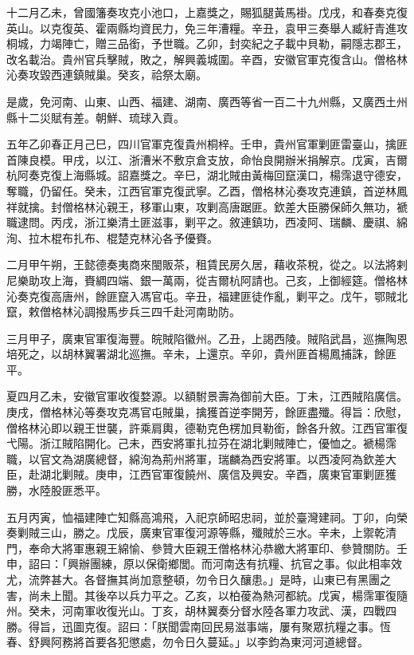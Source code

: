 \begin{pinyinscope}
十二月乙未，曾國籓奏攻克小池口，上嘉獎之，賜狐腿黃馬褂。戊戌，和春奏克復英山。以克復英、霍兩縣均資民力，免三年漕糧。辛丑，袁甲三奏舉人臧紆青進攻桐城，力竭陣亡，贈三品銜，予世職。乙卯，封奕紀之子載中貝勒，嗣隱志郡王，改名載治。貴州官兵擊賊，敗之，解興義城圍。辛酉，安徽官軍克復含山。僧格林沁奏攻毀西連鎮賊巢。癸亥，祫祭太廟。

是歲，免河南、山東、山西、福建、湖南、廣西等省一百二十九州縣，又廣西土州縣十二災賦有差。朝鮮、琉球入貢。

五年乙卯春正月己巳，四川官軍克復貴州桐梓。壬申，貴州官軍剿匪雷臺山，擒匪首陳良模。甲戌，以江、浙漕米不敷京倉支放，命怡良開辦米捐解京。戊寅，吉爾杭阿奏克復上海縣城。詔嘉獎之。辛巳，湖北賊由黃梅回竄漢口，楊霈退守德安，奪職，仍留任。癸未，江西官軍克復武寧。乙酉，僧格林沁奏攻克連鎮，首逆林鳳祥就擒。封僧格林沁親王，移軍山東，攻剿高唐踞匪。欽差大臣勝保師久無功，褫職逮問。丙戌，浙江樂清土匪滋事，剿平之。敘連鎮功，西凌阿、瑞麟、慶祺、綿洵、拉木棍布扎布、棍楚克林沁各予優賚。

二月甲午朔，王懿德奏夷商來閩販茶，租賃民房久居，藉收茶稅，從之。以法將剌尼樂助攻上海，賚綢四端、銀一萬兩，從吉爾杭阿請也。己亥，上御經筵。僧格林沁奏克復高唐州，餘匪竄入馮官屯。辛丑，福建匪徒作亂，剿平之。戊午，鄂賊北竄，敕僧格林沁調撥馬步兵三四千赴河南助防。

三月甲子，廣東官軍復海豐。皖賊陷徽州。乙丑，上謁西陵。賊陷武昌，巡撫陶恩培死之，以胡林翼署湖北巡撫。辛未，上還京。辛卯，貴州匪首楊鳳捕誅，餘匪平。

夏四月乙未，安徽官軍收復婺源。以額駙景壽為御前大臣。丁未，江西賊陷廣信。庚戌，僧格林沁等奏攻克馮官屯賊巢，擒獲首逆李開芳，餘匪盡殲。得旨：欣慰，僧格林沁即以親王世襲，許乘肩輿，德勒克色楞加貝勒銜，餘各升敘。江西官軍復弋陽。浙江賊陷開化。己未，西安將軍扎拉芬在湖北剿賊陣亡，優恤之。褫楊霈職，以官文為湖廣總督，綿洵為荊州將軍，瑞麟為西安將軍。以西凌阿為欽差大臣，赴湖北剿賊。庚申，江西官軍復饒州、廣信及興安。辛酉，廣東官軍剿匪獲勝，水陸股匪悉平。

五月丙寅，恤福建陣亡知縣高鴻飛，入祀京師昭忠祠，並於臺灣建祠。丁卯，向榮奏剿賊三山，勝之。戊辰，廣東官軍復河源等縣，殲賊於三水。辛未，上禦乾清門，奉命大將軍惠親王綿愉、參贊大臣親王僧格林沁恭繳大將軍印、參贊關防。壬申，詔曰：「興辦團練，原以保衛鄉閭。而河南迭有抗糧、抗官之事。似此相率效尤，流弊甚大。各督撫其尚加意整頓，勿令日久釀患。」是時，山東已有黑團之害，尚未上聞。其後卒以兵力平之。乙亥，以柏葰為熱河都統。戊寅，楊霈軍復隨州。癸未，河南軍收復光山。丁亥，胡林翼奏分督水陸各軍力攻武、漢，四戰四勝。得旨，迅圖克復。詔曰：「朕聞雲南回民易滋事端，屢有聚眾抗糧之事。恆春、舒興阿務將首要各犯懲處，勿令日久蔓延。」以李鈞為東河河道總督。


\end{pinyinscope}
